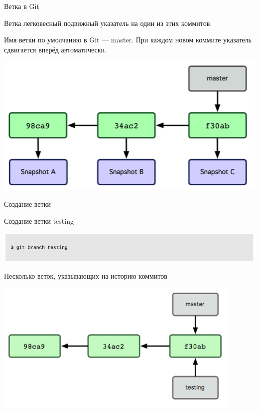\documentclass{beamer}
\begin{document}
\begin{frame}{Ветка в Git}
\begin{block}{Ветка}
легковесный подвижный указатель на один из этих коммитов.
\end{block}
Имя ветки по умолчанию в Git — master. При каждом новом коммите указатель сдвигается вперёд автоматически.
\begin{center}
\includegraphics[scale=0.7]{images/branch-04.png}
\end{center}
\end{frame}

\begin{frame}{Создание ветки}
\begin{block}{Создание ветки testing}
\begin{center}
\includegraphics[scale=0.5]{images/branch-05.png}
\end{center}
\end{block}
\begin{block}{Несколько веток, указывающих на историю коммитов}
\begin{center}
\includegraphics[scale=0.6]{images/branch-06.png}
\end{center}
\end{block}
\end{frame}
\end{document}
